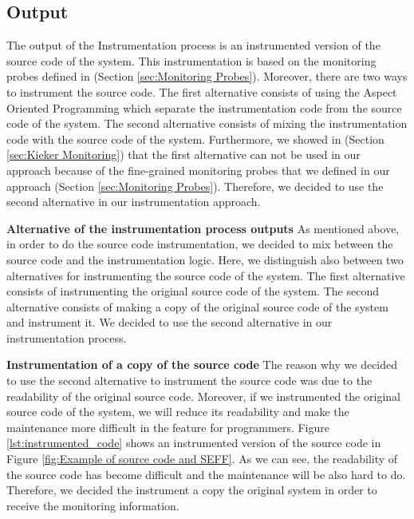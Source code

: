 \subsection{Output}
\label{sec:output}

The output of the Instrumentation process is an instrumented version of the source code of the system.  This instrumentation is based on the monitoring probes defined in (Section \ref{sec:Monitoring Probes}). Moreover, there are two ways to instrument the source code. The first alternative consists of using the Aspect Oriented Programming which separate the instrumentation code from the source code of the system. The second alternative consists of mixing the instrumentation code with the source code of the system. Furthermore, we showed in (Section \ref{sec:Kieker Monitoring}) that the first alternative can not be used in our approach because of the fine-grained monitoring probes that we defined in our approach (Section \ref{sec:Monitoring Probes}). Therefore, we decided to use the second alternative in our instrumentation approach.

\textbf{Alternative of the instrumentation process outputs}
As mentioned above, in order to do the source code instrumentation, we decided to mix between the source code and the instrumentation logic.  Here, we distinguish also between two alternatives for instrumenting the source code of the system. The first alternative consists of instrumenting the original source code of the system. The second alternative consists of making a copy of the original source code of the system and instrument it. We decided to use the second alternative in our instrumentation process. 

\textbf{Instrumentation of a copy of the source code}
The reason why we decided to use the second alternative to instrument the source code was due to the readability of the original source code. Moreover, if we instrumented the original source code of the system, we will reduce its readability and make the maintenance more difficult in the feature for programmers. Figure \ref{lst:instrumented_code} shows an instrumented version of the source code in Figure \ref{fig:Example of source code and SEFF}. As we can see, the readability of the source code has become difficult and the maintenance will be also hard to do. Therefore, we decided the instrument a copy the original system in order to receive the monitoring information.



